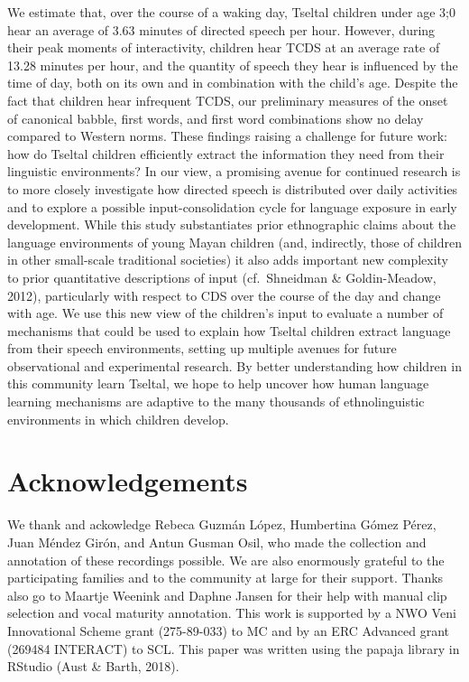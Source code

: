 \documentclass[,man,floatsintext]{apa6}
\begin{document}
We estimate that, over the course of a waking day, Tseltal children
under age 3;0 hear an average of 3.63 minutes of directed speech per
hour. However, during their peak moments of interactivity, children hear
TCDS at an average rate of 13.28 minutes per hour, and the quantity of
speech they hear is influenced by the time of day, both on its own and
in combination with the child's age. Despite the fact that children hear
infrequent TCDS, our preliminary measures of the onset of canonical
babble, first words, and first word combinations show no delay compared
to Western norms. These findings raising a challenge for future work:
how do Tseltal children efficiently extract the information they need
from their linguistic environments? In our view, a promising avenue for
continued research is to more closely investigate how directed speech is
distributed over daily activities and to explore a possible
input-consolidation cycle for language exposure in early development.
While this study substantiates prior ethnographic claims about the
language environments of young Mayan children (and, indirectly, those of
children in other small-scale traditional societies) it also adds
important new complexity to prior quantitative descriptions of input
(cf.~Shneidman \& Goldin-Meadow, 2012), particularly with respect to CDS
over the course of the day and change with age. We use this new view of
the children's input to evaluate a number of mechanisms that could be
used to explain how Tseltal children extract language from their speech
environments, setting up multiple avenues for future observational and
experimental research. By better understanding how children in this
community learn Tseltal, we hope to help uncover how human language
learning mechanisms are adaptive to the many thousands of
ethnolinguistic environments in which children develop.

\section{Acknowledgements}\label{acknowledgements}

We thank and ackowledge Rebeca Guzmán López, Humbertina Gómez Pérez,
Juan Méndez Girón, and Antun Gusman Osil, who made the collection and
annotation of these recordings possible. We are also enormously grateful
to the participating families and to the community at large for their
support. Thanks also go to Maartje Weenink and Daphne Jansen for their
help with manual clip selection and vocal maturity annotation. This work
is supported by a NWO Veni Innovational Scheme grant (275-89-033) to MC
and by an ERC Advanced grant (269484 INTERACT) to SCL. This paper was
written using the papaja library in RStudio (Aust \& Barth, 2018).
\end{document}
